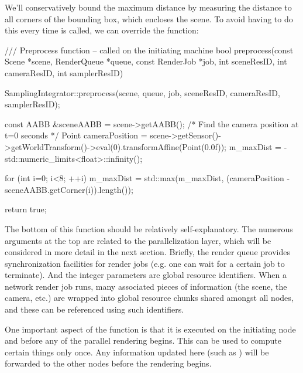 We'll conservatively bound the maximum distance by measuring the
distance to all corners of the bounding box, which encloses the scene.
To avoid having to do this every time  is called,
we can override the  function:
\begin{cpp}
    /// Preprocess function -- called on the initiating machine
    bool preprocess(const Scene *scene, RenderQueue *queue,
            const RenderJob *job, int sceneResID, int cameraResID,
            int samplerResID) {
        SamplingIntegrator::preprocess(scene, queue, job, sceneResID,
            cameraResID, samplerResID);

        const AABB &sceneAABB = scene->getAABB();
    /* Find the camera position at t=0 seconds */
        Point cameraPosition = scene->getSensor()->getWorldTransform()->eval(0).transformAffine(Point(0.0f));
        m_maxDist = - std::numeric_limits<float>::infinity();

        for (int i=0; i<8; ++i)
            m_maxDist = std::max(m_maxDist,
                (cameraPosition - sceneAABB.getCorner(i)).length());

        return true;
    }
\end{cpp}
The bottom of this function should be relatively self-explanatory. The
numerous arguments at the top are related to the parallelization layer, which will be
considered in more detail in the next section. Briefly, the render queue
provides synchronization facilities for render jobs (e.g. one can wait
for a certain job to terminate). And the integer parameters are
global resource identifiers. When a network render job runs, many associated
pieces of information (the scene, the camera, etc.) are wrapped into global resource chunks
shared amongst all nodes, and these can be referenced using such identifiers.

One important aspect of the  function is that it is executed
on the initiating node and before any of the parallel rendering begins.
This can be used to compute certain things only once. Any
information updated here (such as ) will be forwarded to the
other nodes before the rendering begins.

